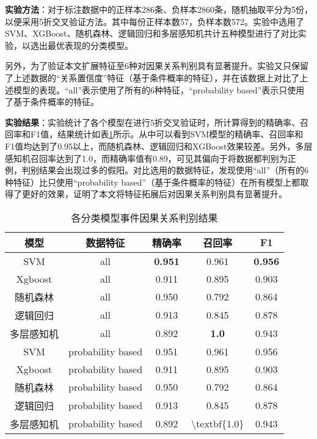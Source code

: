 \textbf{实验方法}：对于标注数据中的正样本286条、负样本2860条，随机抽取平分为5份，以便采用5折交叉验证方法。其中每份正样本数57，负样本数572。实验中选用了SVM、XGBoost、随机森林、逻辑回归和多层感知机共计五种模型进行了对比实验，以选出最优表现的分类模型。

另外，为了验证本文扩展特征至6种对因果关系判别具有显著提升。实验又只保留了上述数据的“关系置信度”特征（基于条件概率的特征），并在该数据上对比了上述模型的表现。“all”表示使用了所有的6种特征，“probability based”表示只使用了基于条件概率的特征。

\textbf{实验结果}：实验统计了各个模型在进行5折交叉验证时，所计算得到的精确率、召回率和F1值，结果统计如表\ref{cause-relation-result}所示。从中可以看到SVM模型的精确率、召回率和F1值均达到了0.95以上，而随机森林、逻辑回归和XGBoost效果较差。另外，多层感知机召回率达到了1.0，而精确率值有0.89，可见其偏向于将数据都判别为正例，判别结果会出现过多的假阳。对比选用的数据特征，发现使用“all”（所有的6种特征）比只使用“probability based”（基于条件概率的特征）在所有模型上都取得了更好的效果，证明了本文将特征拓展后对因果关系判别具有显著提升。
\begin{table}[]
    \caption{各分类模型事件因果关系判别结果}
    \centering
    \label{cause-relation-result}
    \begin{tabular}{ccccc}
    \hline
    模型      & 数据特征              & 精确率            & 召回率                           & F1             \\ \hline
    SVM     & all               & \textbf{0.951} & 0.961                         & \textbf{0.956} \\
    Xgboost & all               & 0.911          & 0.895                         & 0.903          \\
    随机森林    & all               & 0.950          & 0.792                         & 0.864          \\
    逻辑回归    & all               & 0.913          & 0.845                         & 0.878          \\
    多层感知机   & all               & 0.892          & \textbf{1.0}                  & 0.943          \\ \hline
    SVM     & probability based & 0.951          & 0.961                         & 0.956          \\
    Xgboost & probability based & 0.911          & 0.895                         & 0.903          \\
    随机森林    & probability based & 0.950          & 0.792                         & 0.864          \\
    逻辑回归    & probability based & 0.913          & 0.845                         & 0.878          \\
    多层感知机   & probability based & 0.892          & \textbackslash{}textbf\{1.0\} & 0.943          \\ \hline
    \end{tabular}
    \end{table}

